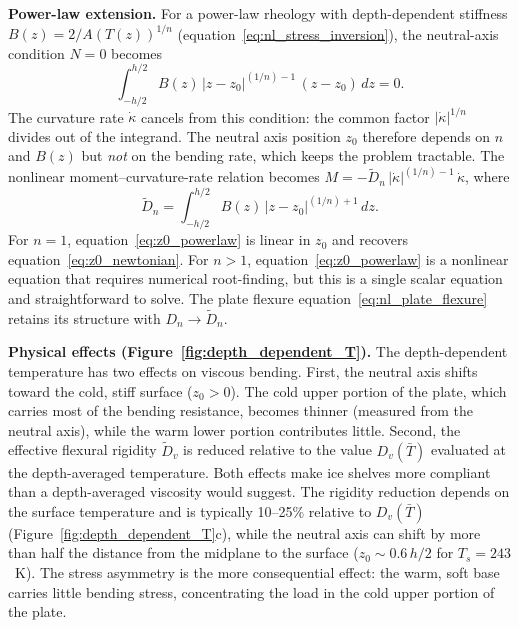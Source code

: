 \documentclass[11pt]{article}
\begin{document}
\medskip
\noindent\textbf{Power-law extension.}  For a power-law rheology with depth-dependent stiffness $B(z) = 2/A(T(z))^{1/n}$ (equation~\eqref{eq:nl_stress_inversion}), the neutral-axis condition $N = 0$ becomes
\begin{equation}
  \int_{-h/2}^{h/2}\!B(z)\,|z - z_0|^{(1/n)-1}\,(z - z_0)\,dz = 0.
  \label{eq:z0_powerlaw}
\end{equation}
The curvature rate $\dot{\kappa}$ cancels from this condition: the common factor $|\dot{\kappa}|^{1/n}$ divides out of the integrand.  The neutral axis position $z_0$ therefore depends on $n$ and $B(z)$ but \textit{not} on the bending rate, which keeps the problem tractable.  The nonlinear moment--curvature-rate relation becomes $M = -\tilde{D}_n\,|\dot{\kappa}|^{(1/n)-1}\,\dot{\kappa}$, where
\begin{equation}
  \tilde{D}_n = \int_{-h/2}^{h/2}\!B(z)\,|z - z_0|^{(1/n)+1}\,dz.
  \label{eq:Dn_tilde}
\end{equation}
For $n = 1$, equation~\eqref{eq:z0_powerlaw} is linear in $z_0$ and recovers equation~\eqref{eq:z0_newtonian}.  For $n > 1$, equation~\eqref{eq:z0_powerlaw} is a nonlinear equation that requires numerical root-finding, but this is a single scalar equation and straightforward to solve.  The plate flexure equation~\eqref{eq:nl_plate_flexure} retains its structure with $D_n \to \tilde{D}_n$.

\medskip
\noindent\textbf{Physical effects (Figure~\ref{fig:depth_dependent_T}).}  The depth-dependent temperature has two effects on viscous bending.  First, the neutral axis shifts toward the cold, stiff surface ($z_0 > 0$).  The cold upper portion of the plate, which carries most of the bending resistance, becomes thinner (measured from the neutral axis), while the warm lower portion contributes little.  Second, the effective flexural rigidity $\tilde{D}_v$ is reduced relative to the value $D_v(\bar{T})$ evaluated at the depth-averaged temperature.  Both effects make ice shelves more compliant than a depth-averaged viscosity would suggest.  The rigidity reduction depends on the surface temperature and is typically 10--25\% relative to $D_v(\bar{T})$ (Figure~\ref{fig:depth_dependent_T}c), while the neutral axis can shift by more than half the distance from the midplane to the surface ($z_0 \sim 0.6\,h/2$ for $T_s = 243$~K).  The stress asymmetry is the more consequential effect: the warm, soft base carries little bending stress, concentrating the load in the cold upper portion of the plate.
\end{document}

